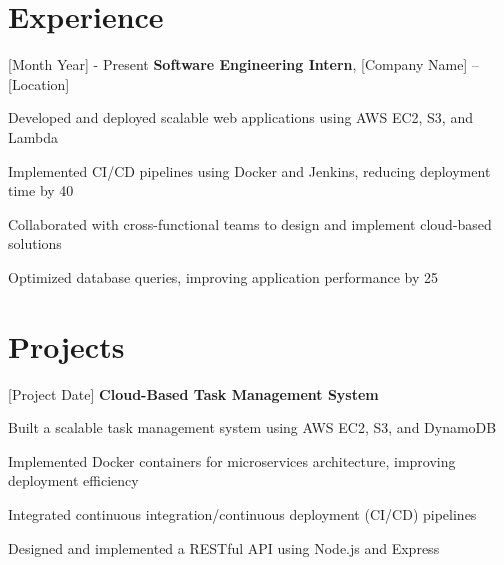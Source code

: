     \section{Experience}

    \begin{twocolentry}{
        [Month Year] - Present
    }
        \textbf{Software Engineering Intern}, [Company Name] -- [Location]
    \end{twocolentry}

    \vspace{0.10 cm}
    \begin{onecolentry}
        \begin{highlights}
            \item Developed and deployed scalable web applications using AWS EC2, S3, and Lambda
            \item Implemented CI/CD pipelines using Docker and Jenkins, reducing deployment time by 40%
            \item Collaborated with cross-functional teams to design and implement cloud-based solutions
            \item Optimized database queries, improving application performance by 25%
        \end{highlights}
    \end{onecolentry}

    \section{Projects}

    \begin{twocolentry}{
        [Project Date]
    }
        \textbf{Cloud-Based Task Management System}
    \end{twocolentry}

    \vspace{0.10 cm}
    \begin{onecolentry}
        \begin{highlights}
            \item Built a scalable task management system using AWS EC2, S3, and DynamoDB
            \item Implemented Docker containers for microservices architecture, improving deployment efficiency
            \item Integrated continuous integration/continuous deployment (CI/CD) pipelines
            \item Designed and implemented a RESTful API using Node.js and Express
        \end{highlights}
    \end{onecolentry}

